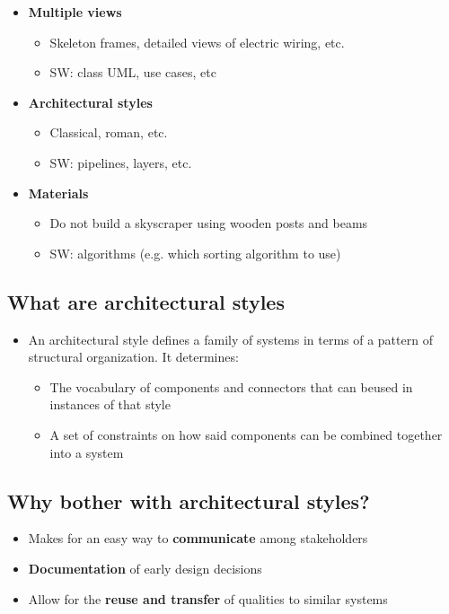 \documentclass[12pt]{book}
\begin{document}
\begin{itemize}
    \item \textbf{Multiple views}
    \begin{itemize}
        \item Skeleton frames, detailed views of electric wiring, etc.
        \item SW: class UML, use cases, etc
    \end{itemize} 

    \item \textbf{Architectural styles}
    \begin{itemize}
        \item Classical, roman, etc.
        \item SW: pipelines, layers, etc.
    \end{itemize} 

    \item \textbf{Materials}
    \begin{itemize}
        \item Do not build a skyscraper using wooden posts and beams
        \item SW: algorithms (e.g. which sorting algorithm to use)
    \end{itemize} 
\end{itemize}

\subsection{What are architectural styles}

\begin{itemize}
    \item An architectural style defines a family of systems in terms of a pattern of structural organization. It determines:
    \begin{itemize}
        \item The vocabulary of components and connectors that can beused in instances of that style
        \item A set of constraints on how said components can be combined together into a system
    \end{itemize}
\end{itemize}

\subsection{Why bother with architectural styles?}
\begin{itemize}
    \item Makes for an easy way to \textbf{communicate} among stakeholders
    \item \textbf{Documentation} of early design decisions
    \item Allow for the \textbf{reuse and transfer} of qualities to similar systems
\end{itemize}
\end{document}
